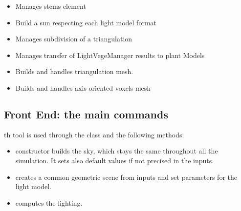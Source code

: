 \documentclass[letterpaper,10pt,english]{sphinxmanual}
\begin{document}
\begin{itemize}
\item {} 
\sphinxAtStartPar
{} Manages stems element

\item {} 
\sphinxAtStartPar
{} Build a sun respecting each light model format

\item {} 
\sphinxAtStartPar
{} Manages subdivision of a triangulation

\item {} 
\sphinxAtStartPar
{} Manages transfer of LightVegeManager results to plant Models

\item {} 
\sphinxAtStartPar
{} Builds and handles triangulation mesh.

\item {} 
\sphinxAtStartPar
{} Builds and handles axis oriented voxels mesh

\end{itemize}


\subsection{Front End: the main commands}
\label{\detokenize{architecture:front-end-the-main-commands}}\label{\detokenize{architecture:frontend}}
\sphinxAtStartPar
th tool is used through the class  and the following methods:
\begin{itemize}
\item {} 
\sphinxAtStartPar
constructor  builds the sky, which stays the same throughout all the simulation. It sets also default values if not precised in the inputs.

\item {} 
\sphinxAtStartPar
{} creates a common geometric scene from inputs and set parameters for the light model.

\item {} 
\sphinxAtStartPar
{} computes the lighting.

\end{itemize}
\end{document}
